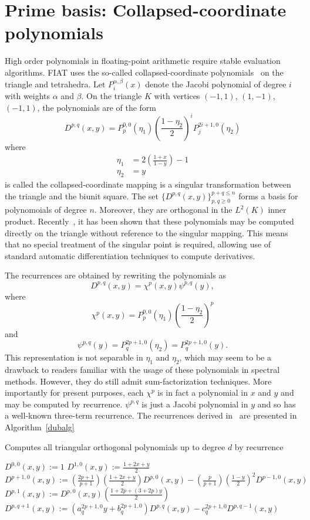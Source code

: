 \section{Prime basis: Collapsed-coordinate polynomials}
High order polynomials in floating-point arithmetic require stable
evaluation algorithms.  FIAT uses the so-called collapsed-coordinate
polynomials~\cite{KarShe99} on the triangle and tetrahedra.  Let
\(P^{\alpha,\beta}_i(x) \) denote the Jacobi polynomial of degree \( i
\) with weights \( \alpha \) and \( \beta \).
On the triangle \( K \)
with vertices \( (-1,1) \), \((1,-1) \), \( (-1,1) \), the
polynomials are of the form
\[
  D^{p,q}( x,y ) = P^{0,0}_{p}(\eta_1)  \left( \frac{1-\eta_2}{2}
  \right)^i P^{2i+1,0}_j(\eta_2)
\]
where
\[
\begin{split}
\eta_1 & = 2\left( \frac{1+x}{1-y} \right) - 1\\
\eta_2 & = y
\end{split}
\]
is called the collapsed-coordinate mapping is a singular
transformation between the triangle and the biunit
square.  The set \( \{ D^{p,q}( x,y) \}_{p,q \geq 0}^{p+q\leq n} \)
forms a basis for polynomoials of degree \( n \).  Moreover, they are
orthogonal in the \( L^2(K) \) inner product.
Recently~\cite{Kir09}, it has been shown that these polynomials
may be computed directly on the triangle without reference to the
singular mapping.  This means that no special treatment of the
singular point is required, allowing use of standard automatic
differentiation techniques to compute derivatives.

The recurrences are obtained by rewriting the polynomials as
\[
D^{p,q}(x,y) = \chi^{p}(x,y) \psi^{p,q}(y),
\]
where \[
 \chi^{p}(x,y) = P^{0,0}_p(\eta_1) \left( \frac{1-\eta_2}{2}
\right)^p
\]
and
\[
\psi^{p,q}(y) = P^{2p+1,0}_q(\eta_2) = P^{2p+1,0}_q(y).
\]
This representation is not separable in \( \eta_1 \) and \( \eta_2 \),
which may seem to be a drawback to readers familiar with the usage of
these polynomials in spectral methods.  However, they do still admit
sum-factorization techniques.  More importantly for present purposes,
each \( \chi^p \) is in fact a polynomial in \( x \) and \( y \) and
may be computed by recurrence.  \( \psi^{p,q} \) is just a Jacobi
polynomial in \( y \) and so has a well-known three-term recurrence.
The recurrences derived in~\cite{Kir09} are presented in Algorithm~\ref{dubalg}
\begin{algorithm}
\caption{Computes all triangular orthogonal polynomials up to degree
  \( d \) by recurrence}
\label{dubalg}
\begin{algorithmic}[1]
\State $D^{0,0}(x,y) := 1$
\State $D^{1,0}(x,y) := \frac{1+2x+y}{2}$
\State $D^{p+1,0}(x,y) := \left( \frac{2p+1}{p+1} \right)
\left( \frac{1 + 2x + y}{2} \right) D^{p,0}(x,y)
- \left( \frac{p}{p+1} \right) \left( \frac{1-y}{2} \right)^2
D^{p-1,0}(x,y)$
\EndFor
{}
\State $D^{p,1}(x,y) := D^{p,0}(x,y) \left( \frac{1+2p+(3+2p) y}{2} \right)$
\EndFor
{}
\State $D^{p,q+1}(x,y) :=
\left( a_{q}^{2p+1,0} y + b_q^{2p+1,0} \right) D^{p,q}(x,y)
- c_q^{2p+1,0} D^{p,q-1}(x,y)$
\EndFor
\EndFor
\end{algorithmic}
\end{algorithm}



